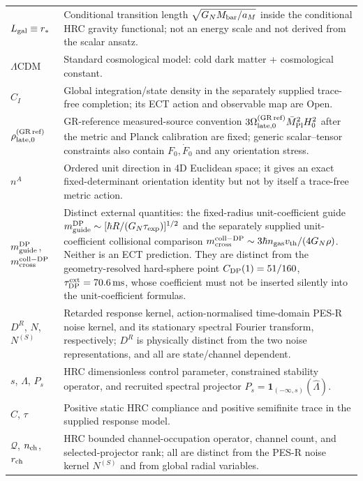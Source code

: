 \documentclass[11pt,a4paper]{article}
\begin{document}
\begin{longtable}{@{}p{2.6cm}p{12.6cm}@{}}
$L_{\rm gal}\equiv r_*$ & Conditional transition length $\sqrt{G_NM_{\rm bar}/a_M}$ inside the conditional HRC gravity functional; not an energy scale and not derived from the scalar ansatz. \\
$\Lambda$CDM & Standard cosmological model: cold dark matter + cosmological constant. \\
$C_I$ & Global integration/state density in the separately supplied trace-free completion; its ECT action and observable map are Open. \\
$\rho_{\rm late,0}^{(\rm GR\,ref)}$ & GR-reference measured-source convention $3\Omega_{\rm late,0}^{(\rm GR\,ref)}\bar M_{\rm Pl}^2H_0^2$ after the metric and Planck calibration are fixed; generic scalar--tensor constraints also contain $F_0,\dot F_0$ and any orientation stress. \\
$n^A$ & Ordered unit direction in 4D Euclidean space; it gives an exact fixed-determinant orientation identity but not by itself a trace-free metric action. \\
$m_{\rm guide}^{\rm DP}$, $m_{\rm cross}^{\rm coll-DP}$ & Distinct external quantities: the fixed-radius unit-coefficient guide $m_{\rm guide}^{\rm DP}\sim[\hbar R/(G_N\tau_{\rm exp})]^{1/2}$ and the separately supplied unit-coefficient collisional comparison $m_{\rm cross}^{\rm coll-DP}\sim3\hbar n_{\rm gas}v_{\rm th}/(4G_N\rho)$.  Neither is an ECT prediction.  They are distinct from the geometry-resolved hard-sphere point $C_{\rm DP}(1)=51/160$, $\tau_{\rm DP}^{\rm ext}=70.6\,\mathrm{ms}$, whose coefficient must not be inserted silently into the unit-coefficient formulas. \\
$D^R$, $N$, $N^{(S)}$ & Retarded response kernel, action-normalised time-domain PES-R noise kernel, and its stationary spectral Fourier transform, respectively; $D^R$ is physically distinct from the two noise representations, and all are state/channel dependent. \\
$s$, $\widehat\Lambda$, $P_s$ & HRC dimensionless control parameter, constrained stability operator, and recruited spectral projector $P_s=\mathbf1_{(-\infty,s)}(\widehat\Lambda)$. \\
$C$, $\tau$ & Positive static HRC compliance and positive semifinite trace in the supplied response model. \\
$\mathcal Q$, $n_{\rm ch}$, $r_{\rm ch}$ & HRC bounded channel-occupation operator, channel count, and selected-projector rank; all are distinct from the PES-R noise kernel $N^{(S)}$ and from global radial variables. \\

\end{longtable}
\end{document}
